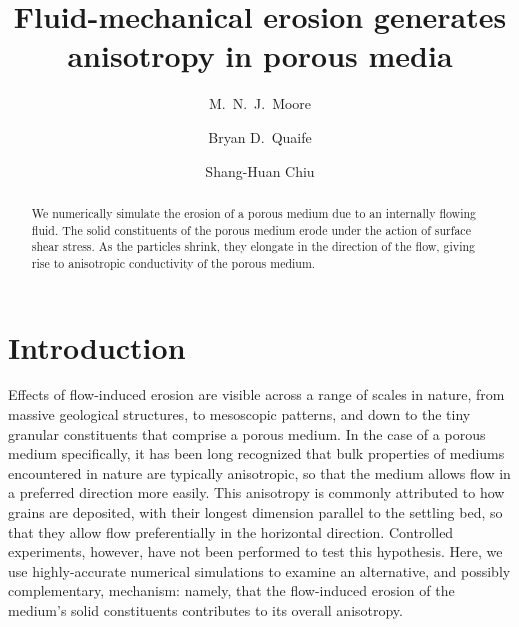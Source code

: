 \documentclass[reprint, superscriptaddress, notitlepage]{revtex4-1}
\begin{document}
\title{Fluid-mechanical erosion generates anisotropy in porous media}
%

\author{M.~N.~J.~Moore}
\author{Bryan D.~Quaife}
\author{Shang-Huan Chiu}

\begin{abstract}
We numerically simulate the erosion of a porous medium due to an internally flowing fluid. The solid constituents of the porous medium erode under the action of surface shear stress. As the particles shrink, they elongate in the direction of the flow, giving rise to anisotropic conductivity of the porous medium.
\end{abstract}
\maketitle

\section{Introduction}

Effects of flow-induced erosion are visible across a range of scales in nature, from massive geological structures, to mesoscopic patterns, and down to the tiny granular constituents that comprise a porous medium. In the case of a porous medium specifically, it has been long recognized that bulk properties of mediums encountered in nature are typically anisotropic, so that the medium allows flow in a preferred direction more easily. This anisotropy is commonly attributed to how grains are deposited, with their longest dimension parallel to the settling bed, so that they allow flow preferentially in the horizontal direction. Controlled experiments, however, have not been performed to test this hypothesis. Here, we use highly-accurate numerical simulations to examine an alternative, and possibly complementary, mechanism: namely, that the flow-induced erosion of the medium's solid constituents contributes to its overall anisotropy.
\end{document}
